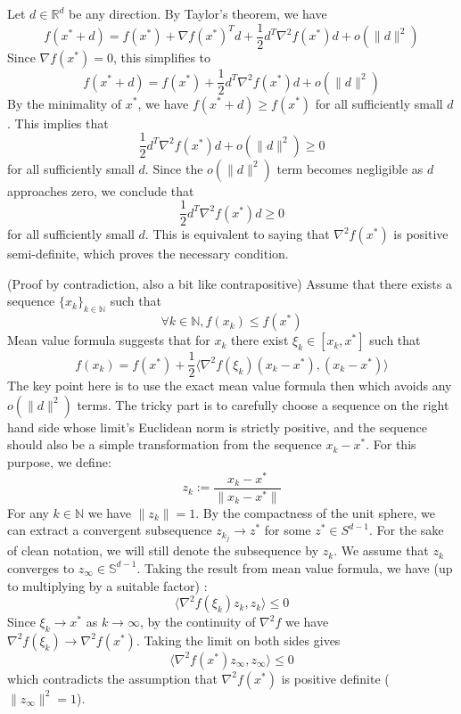 \begin{answerenum}
    \item Let \(d \in \mathbb{R}^d\) be any direction. By Taylor's theorem, we have
        \[ f(x^*+d) = f(x^*) + \nabla f(x^*)^T d + \frac{1}{2} d^T \nabla^2 f(x^*) d + o(\|d\|^2) \]
        Since \(\nabla f(x^*) = 0\), this simplifies to
        \[ f(x^*+d) = f(x^*) + \frac{1}{2} d^T \nabla^2 f(x^*) d + o(\|d\|^2) \]
        By the minimality of \(x^*\), we have \(f(x^*+d) \geq f(x^*)\) for all sufficiently small \(d\). This implies that
        \[ \frac{1}{2} d^T \nabla^2 f(x^*) d + o(\|d\|^2) \geq 0 \]
        for all sufficiently small \(d\). Since the \(o(\|d\|^2)\) term becomes negligible as \(d\) approaches zero, we conclude that
        \[ \frac{1}{2} d^T \nabla^2 f(x^*) d \geq 0 \]
        for all sufficiently small \(d\). This is equivalent to saying that \(\nabla^2 f(x^*)\) is positive semi-definite, which proves the necessary condition.
    \item (Proof by contradiction, also a bit like contrapositive) Assume that there exists a sequence \(\{ x_k \}_{k \in \mathbb{N} }\) such that 
        \[ \forall k \in \mathbb{N}, f(x_k) \leq f(x^*) \]
        Mean value formula suggests that for \(x_k\) there exist \( \xi_k \in [x_k, x^*] \) such that
        \[ f(x_k) = f(x^*) + \frac{1}{2} \langle \nabla^2 f(\xi_k) (x_k - x^*), (x_k - x^*) \rangle \]
        The key point here is to use the exact mean value formula then which avoids any \(o(\|d\|^2)\) terms. The tricky part is to carefully choose a sequence on the right hand side whose limit's Euclidean norm is strictly positive, 
        and the sequence should also be a simple transformation from the sequence \(x_k - x^*\). For this purpose, we define:
        \[ z_k := \frac{x_k-x^*}{\|x_k-x^*\|} \]
        For any \(k \in \mathbb{N}\) we have \(\|z_k\| = 1\). By the compactness of the unit sphere, we can extract a convergent subsequence \(z_{k_j} \to z^*\) for some \(z^* \in S^{d-1}\).
        For the sake of clean notation, we will still denote the subsequence by \(z_k\). We assume that \(z_k\) converges to \(z_{\infty} \in \mathbb{S}^{d-1} \).
        Taking the result from mean value formula, we have (up to multiplying by a suitable factor) :
        \[ \langle \nabla^2 f(\xi_k) z_k, z_k \rangle \leq 0 \]
        Since \(\xi_k \to x^*\) as \(k \to \infty\), by the continuity of \(\nabla^2 f\) we have \(\nabla^2 f(\xi_k) \to \nabla^2 f(x^*)\). Taking the limit on both sides gives
        \[ \langle \nabla^2 f(x^*) z_{\infty}, z_{\infty} \rangle \leq 0 \]
        which contradicts the assumption that \(\nabla^2 f(x^*)\) is positive definite (\(\|z_{\infty}\|^2 = 1\)).

\end{answerenum}
